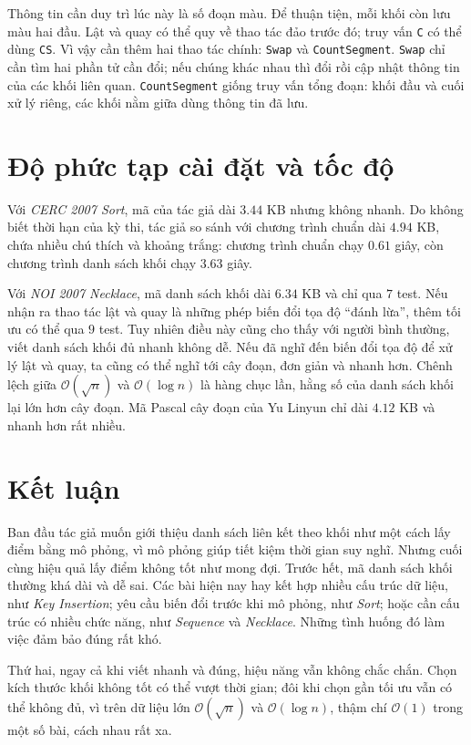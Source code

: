 \documentclass[11pt]{article}
\newcommand{\Oh}{\mathcal{O}}
\begin{document}
Thông tin cần duy trì lúc này là số đoạn màu. Để thuận tiện, mỗi khối còn lưu
màu hai đầu. Lật và quay có thể quy về thao tác đảo trước đó; truy vấn
\texttt{C} có thể dùng \texttt{CS}. Vì vậy cần thêm hai thao tác chính:
\texttt{Swap} và \texttt{CountSegment}. \texttt{Swap} chỉ cần tìm hai phần tử
cần đổi; nếu chúng khác nhau thì đổi rồi cập nhật thông tin của các khối liên
quan. \texttt{CountSegment} giống truy vấn tổng đoạn: khối đầu và cuối xử lý
riêng, các khối nằm giữa dùng thông tin đã lưu.

\section{Độ phức tạp cài đặt và tốc độ}

Với \textit{CERC 2007 Sort}, mã của tác giả dài \(3.44\) KB nhưng không nhanh.
Do không biết thời hạn của kỳ thi, tác giả so sánh với chương trình chuẩn dài
\(4.94\) KB, chứa nhiều chú thích và khoảng trắng: chương trình chuẩn chạy
\(0.61\) giây, còn chương trình danh sách khối chạy \(3.63\) giây.

Với \textit{NOI 2007 Necklace}, mã danh sách khối dài \(6.34\) KB và chỉ qua
\(7\) test. Nếu nhận ra thao tác lật và quay là những phép biến đổi tọa độ
``đánh lừa'', thêm tối ưu có thể qua \(9\) test. Tuy nhiên điều này cũng cho
thấy với người bình thường, viết danh sách khối đủ nhanh không dễ. Nếu đã nghĩ
đến biến đổi tọa độ để xử lý lật và quay, ta cũng có thể nghĩ tới cây đoạn,
đơn giản và nhanh hơn. Chênh lệch giữa \(\Oh(\sqrt n)\) và \(\Oh(\log n)\) là
hàng chục lần, hằng số của danh sách khối lại lớn hơn cây đoạn. Mã Pascal cây
đoạn của Yu Linyun chỉ dài \(4.12\) KB và nhanh hơn rất nhiều.

\section{Kết luận}

Ban đầu tác giả muốn giới thiệu danh sách liên kết theo khối như một cách lấy
điểm bằng mô phỏng, vì mô phỏng giúp tiết kiệm thời gian suy nghĩ. Nhưng cuối
cùng hiệu quả lấy điểm không tốt như mong đợi. Trước hết, mã danh sách khối
thường khá dài và dễ sai. Các bài hiện nay hay kết hợp nhiều cấu trúc dữ liệu,
như \textit{Key Insertion}; yêu cầu biến đổi trước khi mô phỏng, như
\textit{Sort}; hoặc cần cấu trúc có nhiều chức năng, như \textit{Sequence} và
\textit{Necklace}. Những tình huống đó làm việc đảm bảo đúng rất khó.

Thứ hai, ngay cả khi viết nhanh và đúng, hiệu năng vẫn không chắc chắn. Chọn
kích thước khối không tốt có thể vượt thời gian; đôi khi chọn gần tối ưu vẫn
có thể không đủ, vì trên dữ liệu lớn \(\Oh(\sqrt n)\) và \(\Oh(\log n)\), thậm
chí \(\Oh(1)\) trong một số bài, cách nhau rất xa.
\end{document}

